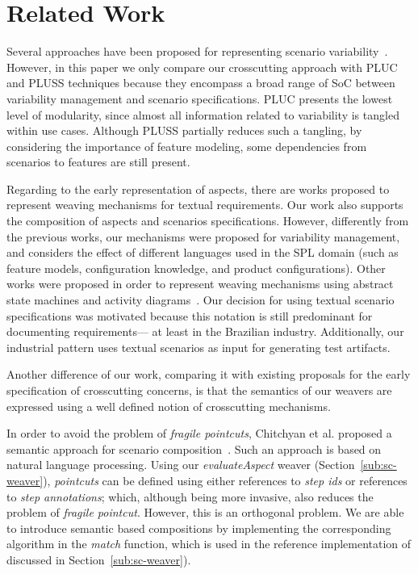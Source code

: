 \documentclass{acm_proc_article-sp}
\begin{document}
\section{Related Work}
\label{sec:related}

Several approaches have been proposed for representing
scenario variability~\cite{Jacobson:1997aa,Griss:1998aa, Eriksson:2005aa,Bertolino:2003aa}. However, in this paper
we only compare our crosscutting approach with PLUC and
PLUSS techniques because they encompass a broad range
of SoC between variability management and scenario specifications.
PLUC presents the lowest level of modularity, since
almost all information related to variability is tangled within
use cases. Although PLUSS partially reduces such a tangling,
by considering the importance of feature modeling, some
dependencies from scenarios to features are still present.

Regarding to the early representation of aspects,
there are works proposed to represent weaving mechanisms for textual requirements. Our work also supports the composition of aspects and scenarios specifications. However, differently from the previous works, our mechanisms were proposed for variability management, and considers the effect of different languages used in the SPL domain (such as feature models, configuration knowledge, and product configurations). 
Other works were proposed in order to represent weaving mechanisms using abstract state machines and activity diagrams~\cite{Noda:2006aa,Cottenier:2006aa,Alferez:2008aa}. Our decision for using textual scenario specifications was motivated because this notation is still predominant for documenting requirements--- at least in the Brazilian industry. Additionally, our industrial pattern uses textual scenarios as input for generating test artifacts.

Another difference of our work, comparing it with existing proposals for the early specification of crosscutting concerns, is that the semantics of our weavers are expressed using a well defined notion of crosscutting mechanisms.

In order to avoid the problem of \emph{fragile pointcuts}, Chitchyan
et al. proposed a semantic approach for scenario
composition~\cite{Chitchyan:2007aa}. Such an approach is based on
natural language processing. Using our \emph{evaluateAspect} weaver
(Section~\ref{sub:sc-weaver}), \emph{pointcuts} can be
defined using either references to \emph{step ids} or references to \emph{step annotations};
which, although being more invasive, also reduces the problem of \emph{fragile pointcut}. However, this is an orthogonal problem. We are able to introduce semantic based compositions by implementing the corresponding algorithm in the \emph{match} function, which is used in the reference implementation of  discussed in Section~\ref{sub:sc-weaver}).
\end{document}
